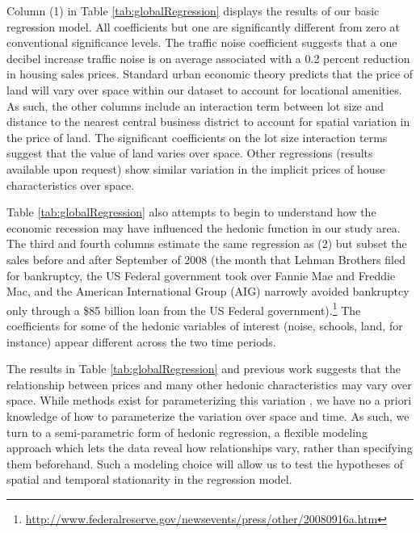 \documentclass{article}\usepackage[]{graphicx}\usepackage[]{color}
\begin{document}
Column (1) in Table \ref{tab:globalRegression} displays the results of our basic regression model. All coefficients but one are significantly different from zero at conventional significance levels. The traffic noise coefficient suggests that a one decibel increase traffic noise is on average associated with a 0.2 percent reduction in housing sales prices. Standard urban economic theory \citep{Alonso1964, Mills1967, Muth1969} predicts that the price of land will vary over space within our dataset to account for locational amenities. As such, the other columns include an interaction term between lot size and distance to the nearest central business district to account for spatial variation in the price of land. The significant coefficients on the lot size interaction terms suggest that the value of land varies over space. Other regressions (results available upon request) show similar variation in the implicit prices of house characteristics over space.

Table \ref{tab:globalRegression} also attempts to begin to understand how the economic recession may have influenced the hedonic function in our study area. The third and fourth columns estimate the same regression as (2) but subset the sales before and after September of 2008 (the month that Lehman Brothers filed for bankruptcy, the US Federal government took over Fannie Mae and Freddie Mac, and the American International Group (AIG) narrowly avoided bankruptcy only through a \$85 billion loan from the US Federal government).\footnote{\url{http://www.federalreserve.gov/newsevents/press/other/20080916a.htm}} The coefficients for some of the hedonic variables of interest (noise, schools, land, for instance) appear different across the two time periods.

The results in Table \ref{tab:globalRegression} and previous work \citep[such as][]{Day2007, MarmolejoDuarteCarlos;GonzalezTamez2009} suggests that the relationship between prices and many other hedonic characteristics may vary over space. While methods exist for parameterizing this variation \citep[such as spatial expansion as suggested by][]{Casetti1972}, we have no a priori knowledge of how to parameterize the variation over space and time. As such, we turn to a semi-parametric form of hedonic regression, a flexible modeling approach which lets the data reveal how relationships vary, rather than specifying them beforehand. Such a modeling choice will allow us to test the hypotheses of spatial and temporal stationarity in the regression model.
\end{document}
